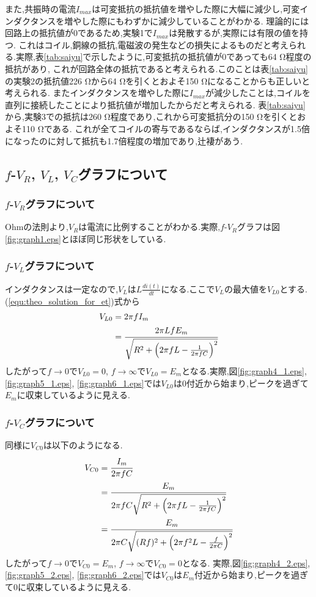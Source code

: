 また,共振時の電流$I_{max}$は可変抵抗の抵抗値を増やした際に大幅に減少し,可変インダクタンスを増やした際にもわずかに減少していることがわかる.
理論的には回路上の抵抗値が0であるため,実験1で$I_{max}$は発散するが,実際には有限の値を持つ.
これはコイル,銅線の抵抗,電磁波の発生などの損失によるものだと考えられる.実際,表\ref{tab:saiyu}で示したように,可変抵抗の抵抗値が0であっても64 \si{\ohm}程度の抵抗があり,
これが回路全体の抵抗であると考えられる.このことは表\ref{tab:saiyu}の実験2の抵抗値226 \si{\ohm}から64 \si{\ohm}を引くとおよそ150 \si{\ohm}になることからも正しいと考えられる.
またインダクタンスを増やした際に$I_{max}$が減少したことは,コイルを直列に接続したことにより抵抗値が増加したからだと考えられる.
表\ref{tab:saiyu}から,実験3での抵抗は260 \si{\ohm}程度であり,これから可変抵抗分の150 \si{\ohm}を引くとおよそ110 \si{\ohm}である.
これが全てコイルの寄与であるならば,インダクタンスが1.5倍になったのに対して抵抗も1.7倍程度の増加であり,辻褄があう.
\subsection{$f$-$V_R$, $V_L$, $V_C$グラフについて}
\subsubsection{$f$-$V_R$グラフについて}
Ohmの法則より,$V_R$は電流に比例することがわかる.実際,$f$-$V_R$グラフは図\ref{fig:graph1.eps}とほぼ同じ形状をしている.
\subsubsection{$f$-$V_L$グラフについて}
インダクタンスは一定なので,$V_L$は$L\frac{di(t)}{dt}$になる.ここで$V_L$の最大値を$V_{L0}$とする. (\ref{equ:theo_solution_for_et})式から
\begin{align*}
  V_{L0}&=2\pi fI_m\\
  &=\cfrac{2\pi LfE_m}{\sqrt{R^2+\left(2\pi fL-\frac{1}{2\pi fC}\right)^2}}
\end{align*}
したがって$f\rightarrow0$で$V_{L0}=0$, $f\rightarrow\infty$で$V_{L0}=E_m$となる.実際,図\ref{fig:graph4_1.eps}, \ref{fig:graph5_1.eps}, \ref{fig:graph6_1.eps}では$V_{L0}$は0付近から始まり,ピークを過ぎて$E_m$に収束しているように見える.
\subsubsection{$f$-$V_C$グラフについて}
同様に$V_{C0}$は以下のようになる.
\begin{align*}
  V_{C0}&=\cfrac{I_m}{2\pi fC}\\
  &=\cfrac{E_m}{2\pi fC\sqrt{R^2+\left(2\pi fL-\frac{1}{2\pi fC}\right)^2}}\\
  &=\cfrac{E_m}{2\pi C\sqrt{(Rf)^2+\left(2\pi f^2L-\frac{f}{2\pi C}\right)^2}}
\end{align*}
したがって$f\rightarrow0$で$V_{C0}=E_m$, $f\rightarrow\infty$で$V_{C0}=0$となる.
実際,図\ref{fig:graph4_2.eps}, \ref{fig:graph5_2.eps}, \ref{fig:graph6_2.eps}では$V_{C0}$は$E_m$付近から始まり,ピークを過ぎて0に収束しているように見える.
